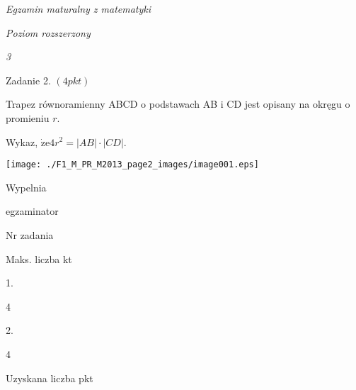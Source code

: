 \documentclass[a4paper,12pt]{article}
\begin{document}
{\it Egzamin maturalny z matematyki}

{\it Poziom rozszerzony}

{\it 3}

Zadanie 2. $(4pkt)$

Trapez równoramienny ABCD o podstawach AB $\mathrm{i}$ CD jest opisany na okręgu o promieniu $r.$

Wykaz, $\dot{\mathrm{z}}\mathrm{e}4r^{2}=|AB|\cdot|CD|.$
\begin{center}
\texttt{[image: ./F1\_M\_PR\_M2013\_page2\_images/image001.eps]}
\end{center}
Wypelnia

egzaminator

Nr zadania

Maks. liczba kt

1.

4

2.

4

Uzyskana liczba pkt
\end{document}

